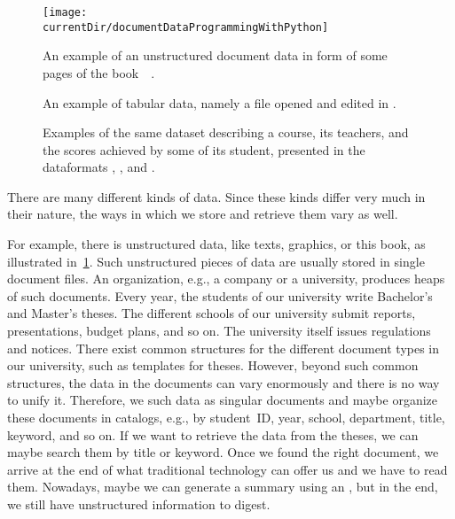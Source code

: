 %
\begin{figure}%
\centering%
\texttt{[image: \\currentDir/documentDataProgrammingWithPython]}%
\caption{An example of an unstructured document data in form of some pages of the book~~\cite{programmingWithPython}.}%
\label{fig:documentDataProgrammingWithPython}%
\end{figure}%
%
\begin{figure}%
\centering%
%
\caption{An example of tabular data, namely a  file opened and edited in \libreofficeCalc.}%
\label{fig:libreOfficeCalc}%
\end{figure}%
%
\begin{figure}%
\centering%
%
%
%
\floatSep%
%
%
%
\floatSep%
%
%
%
\caption{Examples of the same dataset describing a course, its teachers, and the scores achieved by some of its student, presented in the dataformats , , and .}%
\label{fig:treeDataStructures}%
\end{figure}%
%
There are many different kinds of data.%
Since these kinds differ very much in their nature, the ways in which we store and retrieve them vary as well.

For example, there is unstructured data, like texts, graphics, or this book, as illustrated in~\cref{fig:documentDataProgrammingWithPython}.
Such unstructured pieces of data are usually stored in single document files.
An organization, e.g., a company or a university, produces heaps of such documents.
Every year, the students of our university write Bachelor's and Master's theses.
The different schools of our university submit reports, presentations, budget plans, and so on.
The university itself issues regulations and notices.
There exist common structures for the different document types in our university, such as templates for theses.
However, beyond such common structures, the data in the documents can vary enormously and there is no way to unify it.
Therefore, we  such data as singular documents and maybe organize these documents in catalogs, e.g., by student~ID, year, school, department, title, keyword, and so on.
If we want to retrieve the data from the theses, we can maybe search them by title or keyword.
Once we found the right document, we arrive at the end of what traditional technology can offer us and we have to read them.
Nowadays, maybe we can generate a summary using an , but in the end, we still have unstructured information to digest.

